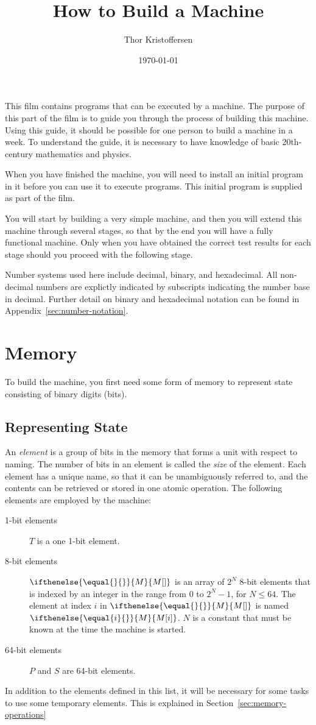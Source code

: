 \documentclass[a4paper,12pt]{article}
\author{Thor Kristoffersen}
\date{\today}
\title{How to Build a Machine}
\newcommand{\MEM}[1]{\ifthenelse{\equal{#1}{}}{M}{M[#1]}}
\newcommand{\PC}{P}
\newcommand{\SP}{S}
\newcommand{\TERM}{T}
\begin{document}
\maketitle

\noindent
This film contains programs that can be executed by a machine.
The purpose of this part of the film is to guide you through the process of building this machine.
Using this guide, it should be possible for one person to build a machine in a week.
To understand the guide, it is necessary to have knowledge of basic 20th-century mathematics and physics.

When you have finished the machine, you will need to install an initial program in it before you can use it to execute programs.
This initial program is supplied as part of the film.

You will start by building a very simple machine, and then you will extend this machine through several stages, so that by the end you will have a fully functional machine.
Only when you have obtained the correct test results for each stage should you proceed with the following stage.

Number systems used here include decimal, binary, and hexadecimal.
All non-decimal numbers are explictly indicated by subscripts indicating the number base in decimal.
Further detail on binary and hexadecimal notation can be found in Appendix~\ref{sec:number-notation}.

\section{Memory}

To build the machine, you first need some form of memory to represent state consisting of binary digits (bits).

\subsection{Representing State}

An \emph{element} is a group of bits in the memory that forms a unit with respect to naming.
The number of bits in an element is called the \emph{size} of the element.
Each element has a unique name, so that it can be unambiguously referred to, and the contents can be retrieved or stored in one atomic operation.
The following elements are employed by the machine:
\begin{description}
\item[1-bit elements]
  $\TERM$ is a one 1-bit element.
\item[8-bit elements]
  $\MEM{}$ is an array of $2^N$ 8-bit elements that is indexed by an integer in the range from $0$ to $2^N - 1$, for $N \le 64$.
  The element at index $i$ in $\MEM{}$ is named $\MEM{i}$.
  $N$ is a constant that must be known at the time the machine is started.
\item[64-bit elements]
  $\PC$ and $\SP$ are 64-bit elements.
\end{description}
In addition to the elements defined in this list, it will be necessary for some tasks to use some temporary elements.
This is explained in Section~\ref{sec:memory-operations}
\end{document}
